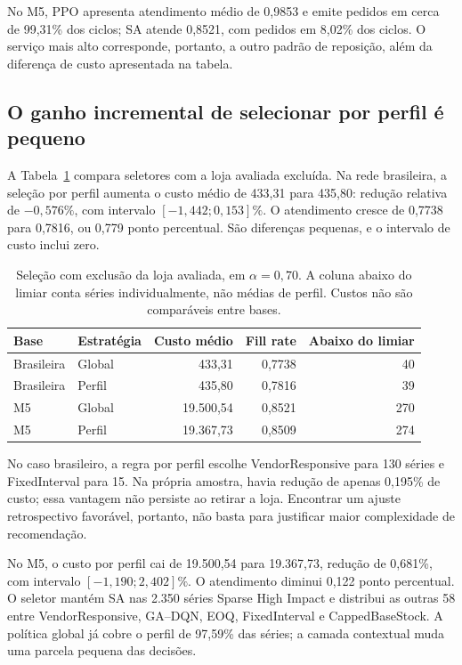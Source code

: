 \documentclass[preprint,12pt]{elsarticle}
\begin{document}
No M5, PPO apresenta atendimento médio de 0,9853 e emite pedidos em cerca de 99,31\% dos ciclos; SA atende 0,8521, com pedidos em 8,02\% dos ciclos. O serviço mais alto corresponde, portanto, a outro padrão de reposição, além da diferença de custo apresentada na tabela.

\subsection{O ganho incremental de selecionar por perfil é pequeno}
A Tabela~\ref{tab:strategies} compara seletores com a loja avaliada excluída. Na rede brasileira, a seleção por perfil aumenta o custo médio de 433,31 para 435,80: redução relativa de $-0{,}576\%$, com intervalo $[-1{,}442;0{,}153]\%$. O atendimento cresce de 0,7738 para 0,7816, ou 0,779 ponto percentual. São diferenças pequenas, e o intervalo de custo inclui zero.

\begin{table}[htbp]
\centering\small
\caption{Seleção com exclusão da loja avaliada, em $\alpha=0{,}70$. A coluna abaixo do limiar conta séries individualmente, não médias de perfil. Custos não são comparáveis entre bases.}\label{tab:strategies}
\begin{tabular}{llrrr}
\toprule
Base & Estratégia & Custo médio & Fill rate & Abaixo do limiar\\
\midrule
Brasileira & Global & 433,31 & 0,7738 & 40\\
Brasileira & Perfil & 435,80 & 0,7816 & 39\\
M5 & Global & 19.500,54 & 0,8521 & 270\\
M5 & Perfil & 19.367,73 & 0,8509 & 274\\
\bottomrule
\end{tabular}
\end{table}

No caso brasileiro, a regra por perfil escolhe VendorResponsive para 130 séries e FixedInterval para 15. Na própria amostra, havia redução de apenas 0,195\% de custo; essa vantagem não persiste ao retirar a loja. Encontrar um ajuste retrospectivo favorável, portanto, não basta para justificar maior complexidade de recomendação.

No M5, o custo por perfil cai de 19.500,54 para 19.367,73, redução de 0,681\%, com intervalo $[-1{,}190;2{,}402]\%$. O atendimento diminui 0,122 ponto percentual. O seletor mantém SA nas 2.350 séries Sparse High Impact e distribui as outras 58 entre VendorResponsive, GA--DQN, EOQ, FixedInterval e CappedBaseStock. A política global já cobre o perfil de 97,59\% das séries; a camada contextual muda uma parcela pequena das decisões.
\end{document}
